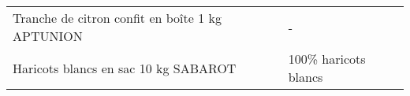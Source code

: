 \begin{longtable}{p{5cm}p{10cm}}
                                                          Tranche de citron confit en boîte 1 kg APTUNION &                                                                                                                                                                                                                                                                                                                                                                                                                                                                                                                                                                                                                                                                                                                                                                                                                                                                                                                                                                                                                                        - \\
                                                                     Haricots blancs en sac 10 kg SABAROT &                                                                                                                                                                                                                                                                                                                                                                                                                                                                                                                                                                                                                                                                                                                                                                                                                                                                                                                                                                                                                     100\% haricots blancs \\

\end{longtable}
